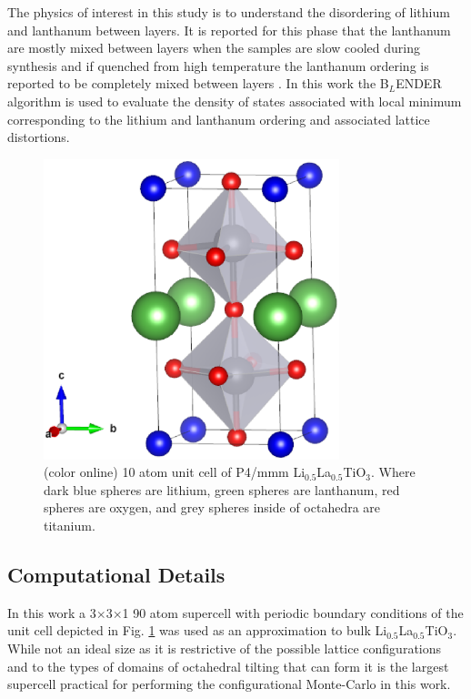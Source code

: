 \documentclass[aps,pre,reprint,superscriptaddress,showkeys]{revtex4-2}
\begin{document}
The physics of interest in this study is to understand the disordering of lithium and lanthanum between layers.  It is reported for this phase that the lanthanum are mostly mixed between layers when the samples are slow cooled during synthesis and if quenched from high temperature the lanthanum ordering is reported to be completely mixed between layers \cite{P4mmmstrucuture}. In this work the B$_L$ENDER algorithm is used to evaluate the density of states associated with local minimum corresponding to  the lithium and lanthanum ordering and associated lattice distortions.   
\begin{figure}[h!]
\includegraphics[width=8.6cm]{fig6.eps}
\caption{(color online) 10 atom unit cell of P4/mmm Li$_{0.5}$La$_{0.5}$TiO$_{3}$. Where dark blue spheres are lithium, green spheres are lanthanum, red spheres are oxygen, and grey spheres inside of octahedra are titanium.\label{LLTO_unit_cell}}
\end{figure}
\subsection{Computational Details}
In this work a 3$\times$3$\times$1 90 atom supercell with periodic boundary conditions of the unit cell depicted in Fig. \ref{LLTO_unit_cell} was used as an approximation to bulk Li$_{0.5}$La$_{0.5}$TiO$_{3}$. While not an ideal size as it is  restrictive of the possible lattice configurations and to the types of domains of octahedral tilting that can form it is the largest supercell practical for performing the configurational Monte-Carlo in this work. 
\end{document}
